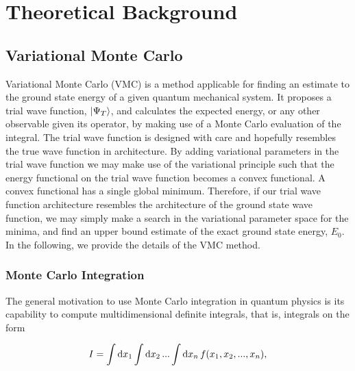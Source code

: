 \section{Theoretical Background}\label{sec:Theory}

\subsection{Variational Monte Carlo}

Variational Monte Carlo (VMC) is a method applicable for finding an estimate to the ground state energy of a given quantum mechanical system. It proposes a trial wave function, $\ket{\Psi_T}$, and calculates the expected energy, or any other observable given its operator, by making use of a Monte Carlo evaluation of the integral. The trial wave function is designed with care and hopefully resembles the true wave function in architecture. By adding variational parameters in the trial wave function we may make use of the variational principle such that the energy functional on the trial wave function becomes a convex functional. A convex functional has a single global minimum. Therefore, if our trial wave function architecture resembles the architecture of the ground state wave function, we may simply make a search in the variational parameter space for the minima, and find an upper bound estimate of the exact ground state energy, $E_0$. In the following, we provide the details of the VMC method. 

\subsubsection{Monte Carlo Integration}

The general motivation to use Monte Carlo integration in quantum physics is its capability to compute multidimensional definite integrals, that is, integrals on the form 

\begin{equation*}
    I = \int \dd{x_1} \int \dd{x_2} ... \int \dd{x_n} f \qty(x_1, x_2, ..., x_n),
\end{equation*}

